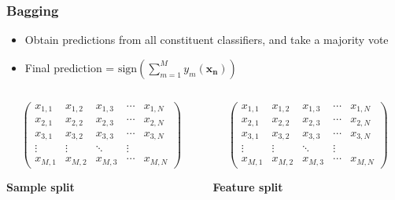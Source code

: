 \documentclass{beamer}
\begin{document}
    \begin{frame}
        \frametitle{Bagging}
        \begin{itemize}
            \item{Obtain predictions from all constituent classifiers, and take a majority vote}
            \item{Final prediction = $\mathrm{sign}(\displaystyle \sum_{m = 1}^M y_m(\mathbf{x_n}))$}
        \end{itemize}
        \begin{columns}
            \begin{column}{0.5\textwidth}
                \[
                \begin{pmatrix}
                    x_{1,1} & x_{1,2} & x_{1, 3} & \cdots & x_{1,N} \\
                    x_{2,1} & x_{2,2} & x_{2, 3} & \cdots & x_{2,N} \\
                    x_{3,1} & x_{3,2} & x_{3, 3} & \cdots & x_{3,N} \\
                    \vdots  & \vdots  & \ddots & \vdots  \\
                    x_{M,1} & x_{M,2} & x_{M, 3} & \cdots & x_{M,N}
                \end{pmatrix}
                \]
                \begin{center}
                    \textbf{Sample split}
                \end{center}
            \end{column}
            \begin{column}{0.5\textwidth}
                \[
                \begin{pmatrix}
                    x_{1,1} & x_{1,2} & x_{1, 3} & \cdots & x_{1,N} \\
                    x_{2,1} & x_{2,2} & x_{2, 3} & \cdots & x_{2,N} \\
                    x_{3,1} & x_{3,2} & x_{3, 3} & \cdots & x_{3,N} \\
                    \vdots  & \vdots  & \ddots & \vdots  \\
                    x_{M,1} & x_{M,2} & x_{M, 3} & \cdots & x_{M,N}
                \end{pmatrix}
                \]
                \begin{center}
                    \textbf{Feature split}
                \end{center}
            \end{column}
        \end{columns}
    \end{frame}
    
\end{document}
